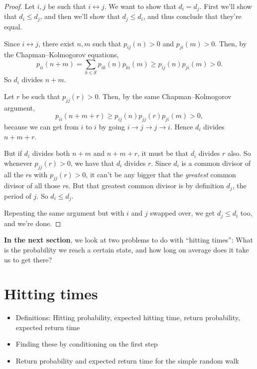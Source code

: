 \documentclass[
  a4paper,
]{article}
\providecommand{\tightlist}{%
  \setlength{\itemsep}{0pt}\setlength{\parskip}{0pt}}
\theoremstyle{definition}
\theoremstyle{definition}
\theoremstyle{definition}
\theoremstyle{remark}
\begin{document}
\begin{proof}

Let \(i,j\) be such that \(i \leftrightarrow j\). We want to show that \(d_i = d_j\). First we'll show that \(d_i \leq d_j\), and then we'll show that \(d_j \leq d_i\), and thus conclude that they're equal.

Since \(i\leftrightarrow j\), there exist \(n,m\) such that \(p_{ij}(n)>0\) and \(p_{ji}(m)>0\). Then, by the Chapman--Kolmogorov equations,
\[ p_{ii}(n+m) =  \sum_{k \in \mathcal S} p_{ik}(n) p_{ki}(m) \geq p_{ij}(n) p_{ji}(m) > 0 .  \]
So \(d_i\) divides \(n+m\).

Let \(r\) be such that \(p_{jj}(r)>0\). Then, by the same Chapman--Kolmogorov argument,
\[
    p_{ii}(n+m+r)\geq  p_{ij}(n) p_{jj}(r) p_{ji}(m) > 0,
    \]
because we can get from \(i\) to \(i\) by going \(i \to j \to j \to i\).
Hence \(d_i\) divides \(n+m+r\).

But if \(d_i\) divides both \(n+m\) and \(n+m+r\), it must be that \(d_i\) divides \(r\) also. So whenever \(p_{jj}(r)>0\), we have that \(d_i\) divides \(r\). Since \(d_i\) is a common divisor of all the \(r\)s with \(p_{jj}(r)>0\), it can't be any bigger that the \emph{greatest} common divisor of all those \(r\)s. But that greatest common divisor is by definition \(d_j\), the period of \(j\). So \(d_i \leq d_j\).

Repeating the same argument but with \(i\) and \(j\) swapped over, we get \(d_j\leq d_i\) too, and we're done.

\end{proof}

\textbf{In the next section}, we look at two problems to do with ``hitting times'': What is the probability we reach a certain state, and how long on average does it take us to get there?

\hypertarget{S08-hitting-times}{%
\section{Hitting times}\label{S08-hitting-times}}

\begin{itemize}
\tightlist
\item
  Definitions: Hitting probability, expected hitting time, return probability, expected return time
\item
  Finding these by conditioning on the first step
\item
  Return probability and expected return time for the simple random walk
\end{itemize}
\end{document}
